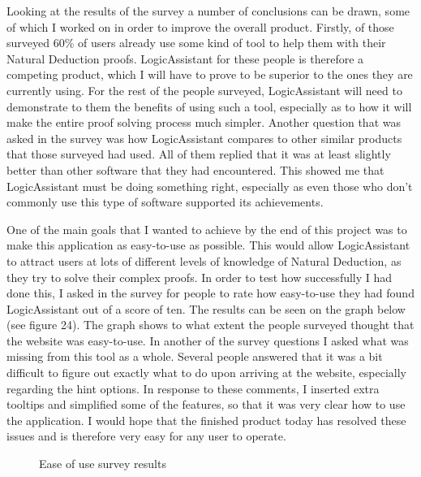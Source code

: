 Looking at the results of the survey a number of conclusions can be drawn, some of which I worked on in order to improve the overall product. Firstly, of those surveyed 60\% of users already use some kind of tool to help them with their Natural Deduction proofs. LogicAssistant for these people is therefore a competing product, which I will have to prove to be superior to the ones they are currently using. For the rest of the people surveyed, LogicAssistant will need to demonstrate to them the benefits of using such a tool, especially as to how it will make the entire proof solving process much simpler. Another question that was asked in the survey was how LogicAssistant compares to other similar products that those surveyed had used. All of them replied that it was at least slightly better than other software that they had encountered. This showed me that LogicAssistant must be doing something right, especially as even those who don't commonly use this type of software supported its achievements.

One of the main goals that I wanted to achieve by the end of this project was to make this application as easy-to-use as possible. This would allow LogicAssistant to attract users at lots of different levels of knowledge of Natural Deduction, as they try to solve their complex proofs. In order to test how successfully I had done this, I asked in the survey for people to rate how easy-to-use they had found LogicAssistant out of a score of ten. The results can be seen on the graph below (see figure 24). The graph shows to what extent the people surveyed thought that the website was easy-to-use. In another of the survey questions I asked what was missing from this tool as a whole. Several people answered that it was a bit difficult to figure out exactly what to do upon arriving at the website, especially regarding the hint options. In response to these comments, I inserted extra tooltips and simplified some of the features, so that it was very clear how to use the application. I would hope that the finished product today has resolved these issues and is therefore very easy for any user to operate.

\begin{figure}[!ht]
	\centering
	\caption{Ease of use survey results}
\end{figure}

